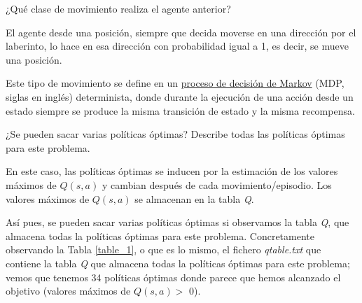 \documentclass[11pt]{exam}
\begin{document}
\begin{questions}
{ \question ¿Qué clase de movimiento realiza el agente anterior?}

El agente desde una posición, siempre que decida moverse en una dirección por el laberinto, lo hace en esa dirección con probabilidad igual a 1, es decir, se mueve una posición. 

Este tipo de movimiento se define en un \href{https://en.wikipedia.org/wiki/Markov_decision_process}{proceso de decisión de Markov} (MDP, siglas en inglés) determinista, donde durante la ejecución de una acción desde un estado siempre se produce la misma transición de estado y la misma recompensa.

{ \question ¿Se pueden sacar varias políticas óptimas? Describe todas las políticas óptimas para este problema.} 

En este caso, las políticas óptimas se inducen por la estimación de los valores máximos de $Q(s,a)$ y cambian después de cada movimiento/episodio. Los valores máximos de $Q(s,a)$ se almacenan en la tabla \textit{Q}. 

Así pues, se pueden sacar varias políticas óptimas si observamos la tabla \textit{Q}, que almacena todas la políticas óptimas para este problema. Concretamente observando la Tabla \ref{table_1}, o que es lo mismo, el fichero \textit{qtable.txt} que contiene la tabla \textit{Q} que almacena todas la políticas óptimas para este problema; vemos que tenemos 34 políticas óptimas donde parece que hemos alcanzado el objetivo (valores máximos de $Q(s,a) >$ 0).

\renewcommand{\tablename}{Tabla}


\end{questions}
\end{document}
